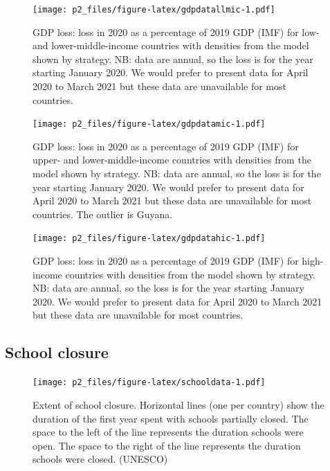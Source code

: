 \documentclass[
]{article}
\begin{document}
\begin{figure}
\centering
\texttt{[image: p2\_files/figure-latex/gdpdatallmic-1.pdf]}
\caption{\label{fig:gdpdatallmic}GDP loss: loss in 2020 as a percentage of 2019 GDP (IMF) for low- and lower-middle-income countries with densities from the model shown by strategy. NB: data are annual, so the loss is for the year starting January 2020. We would prefer to present data for April 2020 to March 2021 but these data are unavailable for most countries.}
\end{figure}

\begin{figure}
\centering
\texttt{[image: p2\_files/figure-latex/gdpdatamic-1.pdf]}
\caption{\label{fig:gdpdatamic}GDP loss: loss in 2020 as a percentage of 2019 GDP (IMF) for upper- and lower-middle-income countries with densities from the model shown by strategy. NB: data are annual, so the loss is for the year starting January 2020. We would prefer to present data for April 2020 to March 2021 but these data are unavailable for most countries. The outlier is Guyana.}
\end{figure}

\begin{figure}
\centering
\texttt{[image: p2\_files/figure-latex/gdpdatahic-1.pdf]}
\caption{\label{fig:gdpdatahic}GDP loss: loss in 2020 as a percentage of 2019 GDP (IMF) for high-income countries with densities from the model shown by strategy. NB: data are annual, so the loss is for the year starting January 2020. We would prefer to present data for April 2020 to March 2021 but these data are unavailable for most countries.}
\end{figure}

\newpage

\hypertarget{school-closure}{%
\subsection{School closure}\label{school-closure}}

\begin{figure}
\centering
\texttt{[image: p2\_files/figure-latex/schooldata-1.pdf]}
\caption{\label{fig:schooldata}Extent of school closure. Horizontal lines (one per country) show the duration of the first year spent with schools partially closed. The space to the left of the line represents the duration schools were open. The space to the right of the line represents the duration schools were closed. (UNESCO)}
\end{figure}
\end{document}
